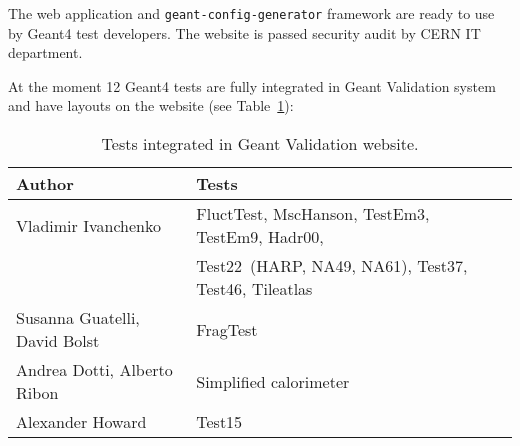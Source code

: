 The web application and {\tt geant-config-generator} framework are ready to use by Geant4 test developers. The website is passed security audit by CERN IT department.

At the moment 12 Geant4 tests are fully integrated in Geant Validation system and have layouts on the website (see Table~\ref{table:tests}):

\begin{table}[h]
\centering
\begin{tabular}{lll}
\hline
Author & Tests  \\\hline
Vladimir Ivanchenko & FluctTest, MscHanson, TestEm3, TestEm9, Hadr00, \\ 
& Test22~(HARP, NA49, NA61), Test37, Test46, Tileatlas \\
Susanna Guatelli, David Bolst & FragTest \\
Andrea Dotti, Alberto Ribon & Simplified calorimeter \\
Alexander Howard & Test15 \\

\end{tabular}
\caption{Tests integrated in Geant Validation website.}
\label{table:tests}
\end{table}


